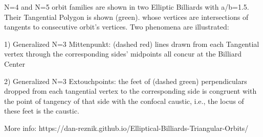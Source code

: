 N=4 and N=5 orbit families are shown in two Elliptic Billiards with a/b=1.5. Their Tangential Polygon is shown (green). whose vertices are intersections of tangents to consecutive orbit's vertices.  Two phenomena are illustrated:

1) Generalized N=3 Mittenpunkt: (dashed red) lines drawn from each Tangential vertex through the corresponding sides' midpoints all concur at the Billiard Center

2) Generalized N=3 Extouchpoints: the feet of (dashed green) perpendiculars dropped from each tangential vertex to the corresponding side is congruent with the point of tangency of that side with the confocal caustic, i.e., the locus of these feet is the caustic.

More info: https://dan-reznik.github.io/Elliptical-Billiards-Triangular-Orbits/